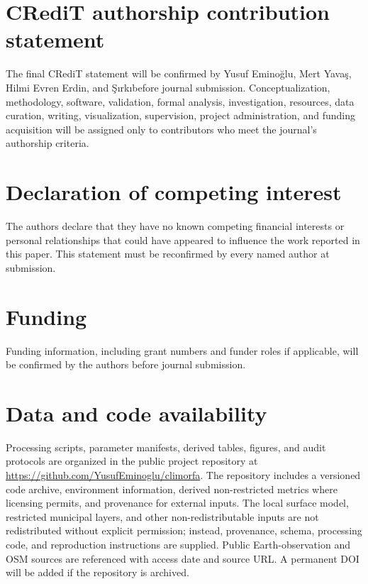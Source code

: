 \section*{CRediT authorship contribution statement}

The final CRediT statement will be confirmed by Yusuf Emino\u{g}lu, Mert
Yava\c{s}, Hilmi Evren Erdin, and \c{S}\i rk\i before journal submission.
Conceptualization, methodology, software, validation, formal analysis,
investigation, resources, data curation, writing, visualization, supervision,
project administration, and funding acquisition will be assigned only to
contributors who meet the journal's authorship criteria.

\section*{Declaration of competing interest}

The authors declare that they have no known competing financial interests or
personal relationships that could have appeared to influence the work reported
in this paper. This statement must be reconfirmed by every named author at
submission.

\section*{Funding}

Funding information, including grant numbers and funder roles if applicable,
will be confirmed by the authors before journal submission.

\section*{Data and code availability}

Processing scripts, parameter manifests, derived tables, figures, and audit
protocols are organized in the public project repository at
\url{https://github.com/YusufEminoglu/climorfa}. The repository includes a
versioned code archive, environment information, derived non-restricted metrics
where licensing permits, and provenance for external inputs. The local surface
model, restricted municipal layers, and other non-redistributable inputs are not redistributed
without explicit permission; instead, provenance, schema, processing code, and
reproduction instructions are supplied. Public Earth-observation and OSM
sources are referenced with access date and source URL. A permanent DOI will be
added if the repository is archived.

